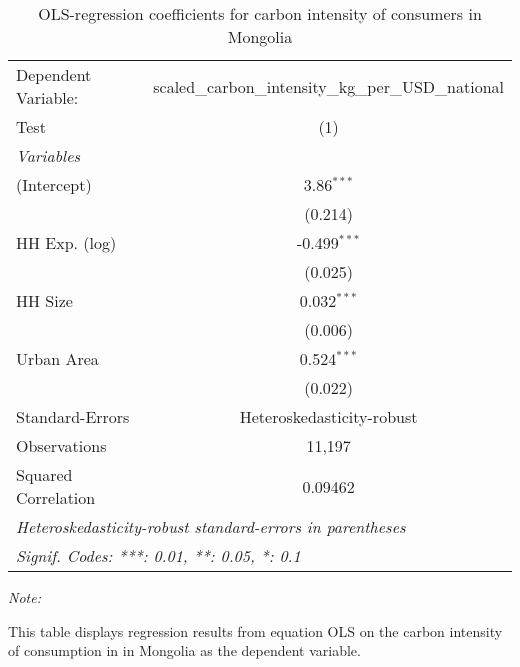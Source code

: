 
\begin{table}[htbp!]
   \centering
   \small
   \begin{adjustbox}{width = 1\textwidth, max height = 0.95\textheight, center}
      \begin{threeparttable}[b]
         \caption{\label{tab:OLS_1_MNG} OLS-regression coefficients for carbon intensity of consumers in Mongolia}
         \begin{tabular}{lc}
            \tabularnewline \midrule \midrule
            Dependent Variable: & scaled\_carbon\_intensity\_kg\_per\_USD\_national\\        
            Test                & (1)\\  
            \midrule
            \emph{Variables}\\
            (Intercept)         & 3.86$^{***}$\\   
                                & (0.214)\\   
            HH Exp. (log)       & -0.499$^{***}$\\   
                                & (0.025)\\   
            HH Size             & 0.032$^{***}$\\   
                                & (0.006)\\   
            Urban Area          & 0.524$^{***}$\\   
                                & (0.022)\\   
            \midrule 
            Standard-Errors     & Heteroskedasticity-robust \\   
            Observations        & 11,197\\  
            Squared Correlation & 0.09462\\  
            \midrule \midrule
            \multicolumn{2}{l}{\emph{Heteroskedasticity-robust standard-errors in parentheses}}\\
            \multicolumn{2}{l}{\emph{Signif. Codes: ***: 0.01, **: 0.05, *: 0.1}}\\
         \end{tabular}
         
         \begin{tablenotes}\item \medskip \textit{Note:}
            \item This table displays regression results from equation OLS on the carbon intensity of consumption in  in Mongolia as the dependent variable. 
         \end{tablenotes}
      \end{threeparttable}
   \end{adjustbox}
\end{table}


